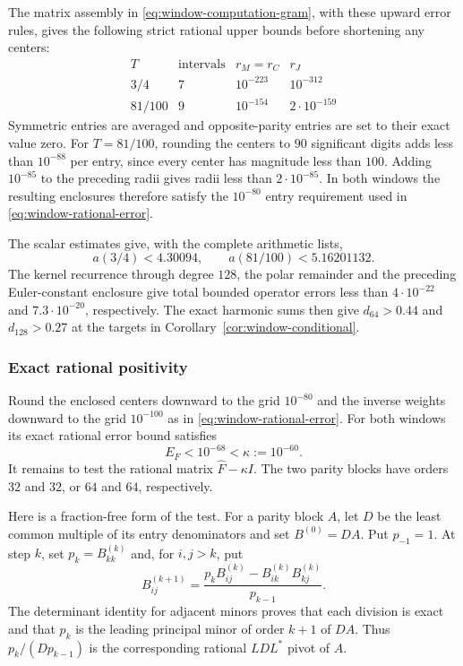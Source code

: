 The matrix assembly in \eqref{eq:window-computation-gram}, with
these upward error rules, gives the following strict rational
upper bounds before shortening any centers:
\[
 \begin{array}{c|c|c|c}
 T&\text{intervals}&r_M=r_C&r_J\\\hline
 3/4&7&10^{-223}&10^{-312}\\
 81/100&9&10^{-154}&2\cdot10^{-159}
 \end{array}
\]
Symmetric entries are averaged and opposite-parity entries are
set to their exact value zero.  For $T=81/100$, rounding the
centers to $90$ significant digits adds less than $10^{-88}$
per entry, since every center has magnitude less than $100$.
Adding $10^{-85}$ to the preceding radii gives radii less than
$2\cdot10^{-85}$.  In both windows the resulting enclosures
therefore satisfy the $10^{-80}$ entry requirement used in
\eqref{eq:window-rational-error}.

The scalar estimates give, with the complete arithmetic lists,
\[
 a(3/4)<4.30094,\qquad a(81/100)<5.16201132.
\]
The kernel recurrence through degree $128$, the polar remainder
and the preceding Euler-constant enclosure give total bounded
operator errors less than $4\cdot10^{-22}$ and
$7.3\cdot10^{-20}$, respectively.  The exact harmonic sums
then give $d_{64}>0.44$ and $d_{128}>0.27$ at the targets in
Corollary~\ref{cor:window-conditional}.

\subsubsection{Exact rational positivity}

Round the enclosed centers downward to the grid $10^{-80}$
and the inverse weights downward to the grid $10^{-100}$ as
in \eqref{eq:window-rational-error}.  For both windows its exact
rational error bound satisfies
\[
 E_F<10^{-68}<\kappa:=10^{-60}.
\]
It remains to test the rational matrix $\widehat F-\kappa I$.
The two parity blocks have orders $32$ and $32$, or $64$ and
$64$, respectively.

Here is a fraction-free form of the test.  For a parity block
$A$, let $D$ be the least common multiple of its entry
denominators and set $B^{(0)}=DA$.  Put $p_{-1}=1$.
At step $k$, set $p_k=B^{(k)}_{kk}$ and, for $i,j>k$, put
\begin{equation}
 B^{(k+1)}_{ij}=
 \frac{p_kB^{(k)}_{ij}-B^{(k)}_{ik}B^{(k)}_{kj}}{p_{k-1}}.
 \label{eq:window-computation-bareiss}
\end{equation}
The determinant identity for adjacent minors proves that each
division is exact and that $p_k$ is the leading principal
minor of order $k+1$ of $DA$.  Thus $p_k/(Dp_{k-1})$ is
the corresponding rational $LDL^*$ pivot of $A$.

